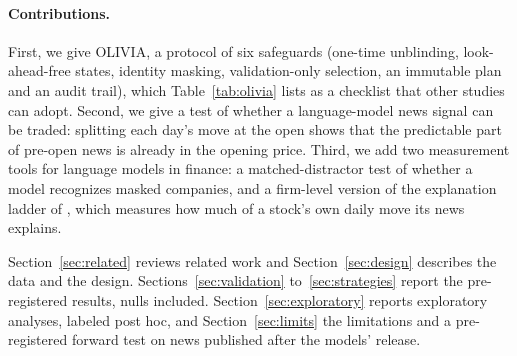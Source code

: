 \paragraph{Contributions.} First, we give OLIVIA, a protocol of six safeguards (one-time unblinding,
look-ahead-free states, identity masking, validation-only selection, an immutable plan and an audit trail), which
Table~\ref{tab:olivia} lists as a checklist that other studies can adopt. Second, we give a test of whether a
language-model news signal can be traded: splitting each day's move at the open shows that the predictable part of
pre-open news is already in the opening price. Third, we add two measurement tools for language models in finance:
a matched-distractor test of whether a model recognizes masked companies, and a firm-level version of the
explanation ladder of \citet{kelly2026}, which measures how much of a stock's own daily move its news explains.

Section~\ref{sec:related} reviews related work and Section~\ref{sec:design} describes the data and the design.
Sections~\ref{sec:validation} to~\ref{sec:strategies} report the pre-registered results, nulls included.
Section~\ref{sec:exploratory} reports exploratory analyses, labeled post hoc, and Section~\ref{sec:limits} the
limitations and a pre-registered forward test on news published after the models' release.
